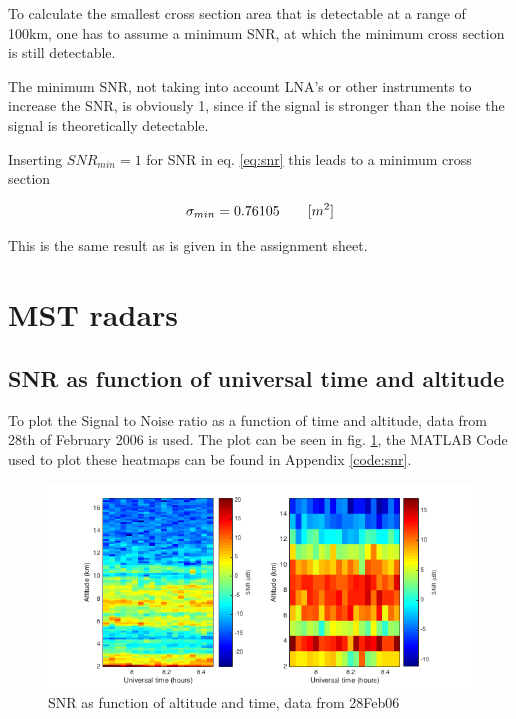 To calculate the smallest cross section area that is detectable at a range of 100km, one has to assume a minimum SNR, at which the minimum cross section is still detectable.

The minimum SNR, not taking into account LNA's or other instruments to increase the SNR, is obviously 1, since if the signal is stronger than the noise the signal is theoretically detectable.

Inserting $SNR_{min} = 1$ for SNR in eq. \ref{eq:snr} this leads to a minimum cross section

\begin{equation}
\label{eq:crossSecResult}
	\centering
	\sigma_{min} = 0.76105 \qquad [m^2]	
\end{equation}

This is the same result as is given in the assignment sheet.


\section{MST radars}

\subsection{SNR as function of universal time and altitude}
To plot the Signal to Noise ratio as a function of time and altitude, data from 28th of February 2006 is used. The plot can be seen in fig. \ref{img:snrPlot}, the MATLAB Code used to plot these heatmaps can be found in Appendix \ref{code:snr}.

\begin{figure}
	\centering
	\label{img:snrPlot}
	\includegraphics[width=\textwidth]{images/task4_plot1}
	\caption{SNR as function of altitude and time, data from 28Feb06}
\end{figure}


